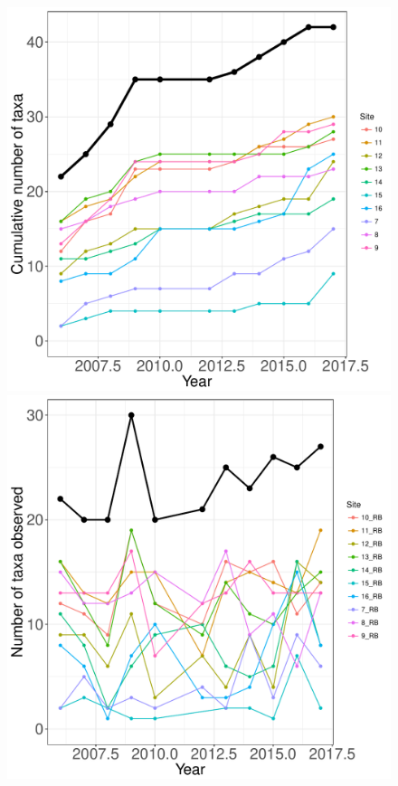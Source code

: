 \documentclass[11pt, oneside]{article}
\begin{document}
\begin{figure}[h!]
\centering
\includegraphics[scale = 0.4]{fce-fish-RehageDry_species_accumulation_curve.pdf}
\includegraphics[scale = 0.4]{fce-fish-RehageDry_num_taxa_over_time.pdf}

\end{figure}
\end{document}
